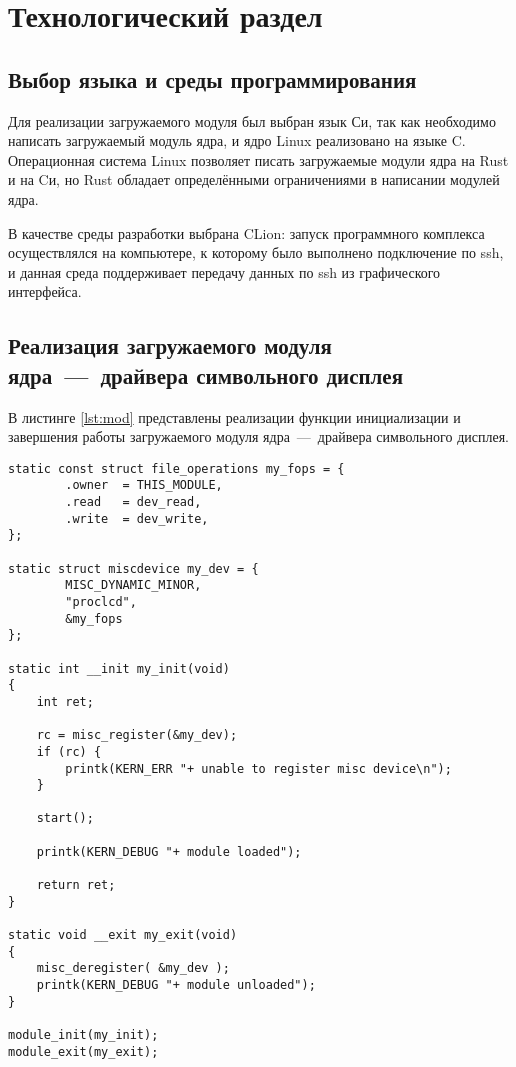 \chapter{Технологический раздел}

\section{Выбор языка и среды программирования}

Для реализации загружаемого модуля был выбран язык Си, так как необходимо написать загружаемый модуль ядра, и ядро Linux реализовано на языке C. Операционная система Linux позволяет писать загружаемые модули ядра на Rust и на Cи, но Rust обладает определёнными ограничениями в написании модулей ядра.

В качестве среды разработки выбрана CLion: запуск программного комплекса осуществлялся на компьютере, к которому было выполнено подключение по ssh, и данная среда поддерживает передачу данных по ssh из графического интерфейса.

\section{Реализация загружаемого модуля ядра~---~драйвера символьного дисплея}

В листинге \ref{lst:mod} представлены реализации функции инициализации и завершения работы загружаемого модуля ядра~---~драйвера символьного дисплея.

\begin{lstlisting}[label=lst:mod,caption=Реализация загружаемого модуля ядра~---~драйвера символьного дисплея]
static const struct file_operations my_fops = {
        .owner  = THIS_MODULE,
        .read   = dev_read,
        .write  = dev_write,
};

static struct miscdevice my_dev = {
        MISC_DYNAMIC_MINOR,
        "proclcd",
        &my_fops
};

static int __init my_init(void)
{
    int ret;

    rc = misc_register(&my_dev);
    if (rc) {
        printk(KERN_ERR "+ unable to register misc device\n");
    }

    start();

    printk(KERN_DEBUG "+ module loaded");

    return ret;
}

static void __exit my_exit(void)
{
    misc_deregister( &my_dev );
    printk(KERN_DEBUG "+ module unloaded");
}

module_init(my_init);
module_exit(my_exit);
\end{lstlisting}

